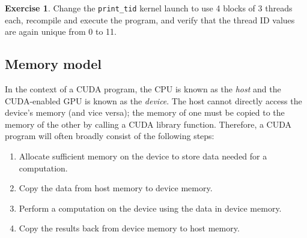 \documentclass{article}
\theoremstyle{definition}
\newtheorem{exercise}{Exercise}
\begin{document}
\begin{exercise}
Change the \texttt{print\_tid} kernel launch to use 4 blocks of 3 threads each, recompile and execute the program, and verify that the thread ID values are again unique from 0 to 11.
\end{exercise}

\subsection{Memory model}

In the context of a CUDA program, the CPU is known as the \emph{host} and the CUDA-enabled GPU is known as the \emph{device}. The host cannot directly access the device's memory (and vice versa); the memory of one must be copied to the memory of the other by calling a CUDA library function. Therefore, a CUDA program will often broadly consist of the following steps:
\begin{enumerate}
    \item Allocate sufficient memory on the device to store data needed for a computation.
    \item Copy the data from host memory to device memory.
    \item Perform a computation on the device using the data in device memory.
    \item Copy the results back from device memory to host memory.
\end{enumerate}
\end{document}
